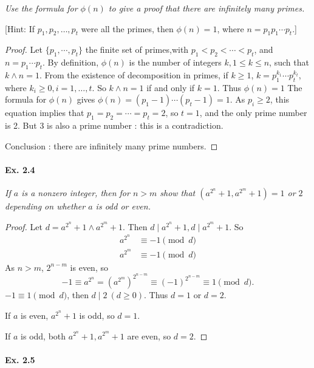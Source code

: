 \documentclass[11pt,a4paper]{article}
\begin{document}
{{\it Use the formula for $\phi(n)$ to give a proof that there are infinitely many primes.

[Hint: If $p_1,p_2,\ldots,p_t$ were all the primes, then $\phi(n) = 1$, where $n=p_1p_1\cdots p_t$.]
}

\begin{proof}
Let $\{p_1,\cdots,p_t\}$ the finite set of primes,with $p_1<p_2<\cdots<p_t$, and $n=p_1\cdots p_t$. By definition, $\phi(n)$ is the number of integers $k, 1\leq k \leq n$, such that $k\wedge n =1$. From the existence of decomposition in primes, if $k\geq 1$,  $k = p_1^{k_1}\cdots p_t^{k_t}$, where $k_i\geq 0, i=1,\ldots, t$. So $k\wedge n = 1$ if and only if $k=1$. Thus $\phi(n)=1$ The formula for $\phi(n)$ gives
$\phi(n) = (p_1-1)\cdots(p_t-1)=1$. As $p_i\geq 2$, this equation implies that  $p_1 = p_2 = \cdots = p_t=2$, so $t=1$, and the only prime number is 2. But 3 is also a prime number : this is a contradiction. 

Conclusion : there are infinitely many prime numbers.
\end{proof}

\paragraph{Ex. 2.4}

{\it If $a$ is a nonzero integer, then for $n > m$ show that $(a^{2^n} + 1, a^{2^m} + 1) = 1$ or $2$ depending on whether $a$ is odd or even.
}

\begin{proof}
Let $d = a^{2^n} + 1 \wedge a^{2^m} + 1$. Then $d \mid  a^{2^n} + 1, d \mid  a^{2^m} + 1$. So
\begin{align*}
a^{2^n}  &\equiv -1 \pmod d\\
a^{2^m} &\equiv -1 \pmod d
\end{align*}
As $n>m$, $2^{n-m}$ is even, so
$$-1 \equiv a^{2^n} = \left(a^{2^m}\right)^{2^{n-m}} \equiv (-1)^{2^{n-m}} \equiv 1 \pmod d.$$
$-1\equiv 1 \pmod d$, then $d \mid 2\ (d\geq 0)$. Thus $d =1$ or $d = 2$.

If $a$ is even, $a^{2^n} + 1$ is odd, so $d=1$.

If $a$ is odd, both $a^{2^n} + 1, a^{2^m} + 1$ are even, so $d=2$.
\end{proof}

\paragraph{Ex. 2.5}

}
\end{document}
